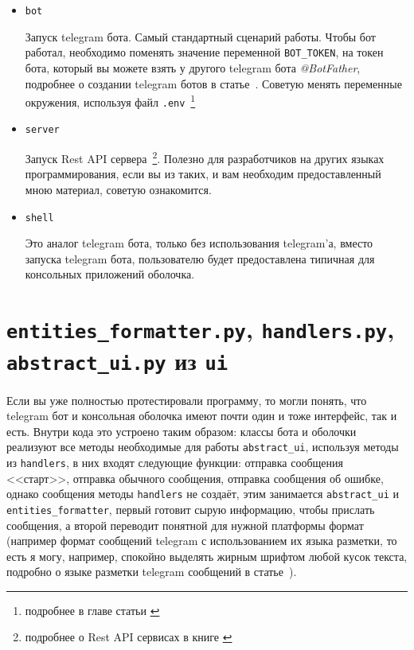 \begin{itemize}
\item \texttt{bot}

Запуск telegram бота.  Самый стандартный сценарий работы.  Чтобы бот работал, необходимо поменять значение переменной \texttt{BOT\_TOKEN}, на токен бота, который вы можете взять у другого telegram бота \emph{@BotFather}, подробнее о создании telegram ботов в статье~\cite{tg-bots}.  Советую менять переменные окружения, используя файл \texttt{.env}~\footnote{подробнее в главе статьи \cite{dotenv}}

\item \texttt{server}

Запуск Rest API сервера~\footnote{подробнее о Rest API сервисах в книге \cite{rest-api}}.  Полезно для разработчиков на других языках программирования, если вы из таких, и вам необходим предоставленный мною материал, советую ознакомится.

\item \texttt{shell}

Это аналог telegram бота, только без использования telegram'а, вместо запуска telegram бота, пользователю будет предоставлена типичная для консольных приложений оболочка.
\end{itemize}

\section*{\texttt{entities\_formatter.py}, \texttt{handlers.py}, \texttt{abstract\_ui.py} из \texttt{ui}}

Если вы уже полностью протестировали программу, то могли понять, что telegram бот и консольная оболочка имеют почти один и тоже интерфейс, так и есть.  Внутри кода это устроено таким образом: классы бота и оболочки реализуют все методы необходимые для работы \texttt{abstract\_ui}, используя методы из \texttt{handlers}, в них входят следующие функции: отправка сообщения {}<<старт>>{}, отправка обычного сообщения, отправка сообщения об ошибке, однако сообщения методы \texttt{handlers} не создаёт, этим занимается \texttt{abstract\_ui} и \texttt{entities\_formatter}, первый готовит сырую информацию, чтобы прислать сообщения, а второй переводит понятной для нужной платформы формат (например формат сообщений telegram с использованием их языка разметки, то есть я могу, например, спокойно выделять жирным шрифтом любой кусок текста, подробно о языке разметки telegram сообщений в статье~\cite{tg-markdown}).

